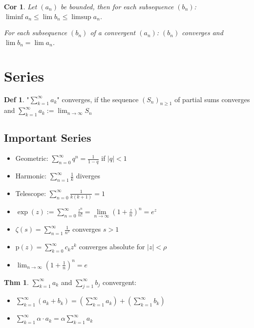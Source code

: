 \documentclass[a4paper, 10pt]{article}
\newtheorem*{corollary}{Cor}
\theoremstyle{definition}
\newtheorem*{theorem}{Thm}
\newtheorem*{definition}{Def}
\theoremstyle{named}
\begin{document}
\begin{corollary}
    Let $(a_n)$ be bounded, then for each subsequence $(b_n)$: $\liminf a_n \leq \lim b_n \leq \limsup a_n$.

    For each subsequence $(b_n)$ of a convergent $(a_n)$: $(b_n)$ converges and $\lim b_n = \lim a_n$.
\end{corollary}

\section{Series}
\begin{definition}
    "$\sum_{k=1}^\infty a_k$" converges, if the sequence $(S_n)_{n \geq 1}$ of partial sums converges and $\sum_{k=1}^\infty a_k := \lim_{n \to \infty} S_n$
\end{definition}

\subsection{Important Series}
\begin{itemize}
    \item Geometric: $\sum_{n = 0}^\infty q^n = \frac{1}{1 - q}$ if $|q| < 1$
    \item Harmonic: $\sum_{n = 1}^\infty \frac{1}{k}$ diverges
    \item Telescope: $\sum_{n = 0}^\infty \frac{1}{k(k + 1)} = 1$
    \item $\exp(z) := \sum_{n = 0}^\infty \frac{z^n}{n!} = \underset{n \to \infty}{\lim}(1 + \frac{z}{n})^n = e^z$
    \item $\zeta(s) = \sum_{n=1}^\infty \frac{1}{n^s}$ converges $s > 1$
    \item $\text{p}(z) = \sum_{k = 0}^\infty c_kz^k$ converges absolute for $|z| < \rho$
    \item $\lim_{n\to\infty} (1 + \frac{1}{n})^n = e$
\end{itemize}

\begin{theorem}
    $\sum_{k = 1}^\infty a_k$ and $\sum_{j = 1}^\infty b_j$ convergent:
    \begin{itemize}
        \item $\sum_{k = 1}^\infty (a_k + b_k) = (\sum_{k = 1}^\infty a_k) + (\sum_{k = 1}^\infty b_k)$
        \item $\sum_{k = 1}^\infty \alpha \cdot a_k = \alpha \sum_{k = 1}^\infty a_k$
    \end{itemize}
\end{theorem}
\end{document}
